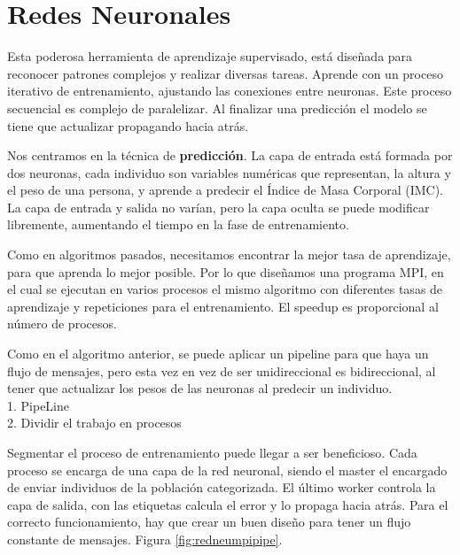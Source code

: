 	
	
	
	


\section{Redes Neuronales}
	Esta poderosa herramienta de aprendizaje supervisado, está diseñada para reconocer patrones complejos y realizar diversas tareas. Aprende con un proceso iterativo de entrenamiento, ajustando las conexiones entre neuronas. Este proceso secuencial es complejo de paralelizar. Al finalizar una predicción el modelo se tiene que actualizar propagando hacia atrás.
	
	Nos centramos en la técnica de \textbf{predicción}. La capa de entrada está formada por dos neuronas, cada individuo son variables numéricas que representan, la altura y el peso de una persona, y aprende a predecir el Índice de Masa Corporal (IMC). La capa de entrada y salida no varían, pero la capa oculta se puede modificar libremente, aumentando el tiempo en la fase de entrenamiento.
	
	
	Como en algoritmos pasados, necesitamos encontrar la mejor tasa de aprendizaje, para que aprenda lo mejor posible. Por lo que diseñamos una programa MPI, en el cual se ejecutan en varios procesos el mismo algoritmo con diferentes tasas de aprendizaje y repeticiones para el entrenamiento. El speedup es proporcional al número de procesos.
	
	\begin{flushleft}
		Como en el algoritmo anterior, se puede aplicar un pipeline para que haya un flujo de mensajes, pero esta vez en vez de ser unidireccional es bidireccional, al tener que actualizar los pesos de las neuronas al predecir un individuo.\\	
		1. PipeLine\\
		2. Dividir el trabajo en procesos
	\end{flushleft}
	
	Segmentar el proceso de entrenamiento puede llegar a ser beneficioso. Cada proceso se encarga de una capa de la red neuronal, siendo el master el encargado de enviar individuos de la población categorizada. El último worker controla la capa de salida, con las etiquetas calcula el error y lo propaga hacia atrás. Para el correcto funcionamiento, hay que crear un buen diseño para tener un flujo constante de mensajes. Figura \ref{fig:redneumpipipe}.
	
	
	
